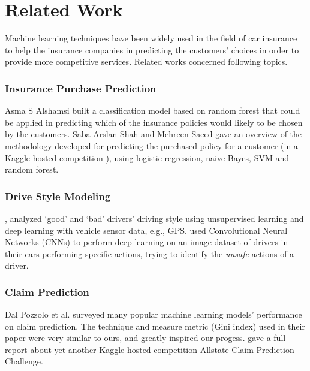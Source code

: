 \documentclass{standalone}
\begin{document}
\section{Related Work}

Machine learning techniques have been widely used in the field of car insurance to help the insurance companies in predicting the customers' choices in order to provide more competitive services. Related works concerned following topics.

\subsubsection{Insurance Purchase Prediction}

Asma S Alshamsi \cite{alshamsi2014predicting} built a classification model based on random forest that could be applied in predicting which of the insurance policies would likely to be chosen by the customers. Saba Arslan Shah and Mehreen Saeed \cite{shahpredicting} gave an overview of the methodology developed for predicting the purchased policy for a
customer (in a Kaggle hosted competition \cite{kaggle:allstatepurchase}), using logistic regression, naive Bayes, SVM and random forest.

\subsubsection{Drive Style Modeling}
\cite{dong2016characterizing}, \cite{nikulin2016driving} analyzed `good' and `bad' drivers' driving style using unsupervised learning and deep learning with vehicle
sensor data, e.g., GPS.
\cite{singhusing} used Convolutional Neural Networks
(CNNs) to perform deep learning on an image dataset  of drivers in their
cars performing specific actions, trying to identify the \emph{unsafe} actions of a driver.

\subsubsection{Claim Prediction}

Dal Pozzolo et al. \cite{dal2010comparison} surveyed many popular machine learning models' performance on claim prediction. The technique and measure metric (Gini index) used in their paper were very similar to ours, and greatly inspired our progess. \cite{huangfu2015data} gave a full report about yet another Kaggle hosted competition Allstate Claim Prediction Challenge\cite{kaggle:allstate}.
\end{document}

